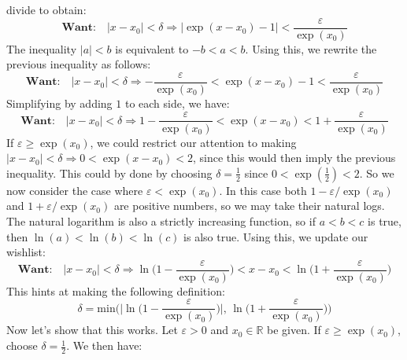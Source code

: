 \documentclass{article}
\theoremstyle{normal}
\theoremstyle{plain}
\begin{document}
    divide to obtain:
    \begin{equation}
        \textbf{Want:}\quad
        |x-x_{0}|<\delta
        \Rightarrow
        \big|\exp(x-x_{0})-1\big|<\frac{\varepsilon}{\exp(x_{0})}
    \end{equation}
    The inequality $|a|<b$ is equivalent to $-b<a<b$. Using this, we rewrite
    the previous inequality as follows:
    \begin{equation}
        \textbf{Want:}\quad
        |x-x_{0}|<\delta
        \Rightarrow
        -\frac{\varepsilon}{\exp(x_{0})}
            <\exp(x-x_{0})-1
            <\frac{\varepsilon}{\exp(x_{0})}
    \end{equation}
    Simplifying by adding $1$ to each side, we have:
    \begin{equation}
        \textbf{Want:}\quad
        |x-x_{0}|<\delta
        \Rightarrow
        1-\frac{\varepsilon}{\exp(x_{0})}
            <\exp(x-x_{0})
            <1+\frac{\varepsilon}{\exp(x_{0})}
    \end{equation}
    If $\varepsilon\geq\exp(x_{0})$, we could restrict our attention to making
    $|x-x_{0}|<\delta\Rightarrow{0}<\exp(x-x_{0})<2$, since this would then
    imply the previous inequality. This could by done by choosing
    $\delta=\frac{1}{2}$ since $0<\exp(\frac{1}{2})<2$. So we now consider the
    case where $\varepsilon<\exp(x_{0})$. In this case both
    $1-\varepsilon/\exp(x_{0})$ and $1+\varepsilon/\exp(x_{0})$ are positive
    numbers, so we may take their natural logs. The natural logarithm is
    also a strictly increasing function, so if $a<b<c$ is true, then
    $\ln(a)<\ln(b)<\ln(c)$ is also true. Using this, we update our wishlist:
    \begin{equation}
        \textbf{Want:}\quad
        |x-x_{0}|<\delta
        \Rightarrow
        \ln\big(1-\frac{\varepsilon}{\exp(x_{0})}\big)
            <x-x_{0}
            <\ln\big(1+\frac{\varepsilon}{\exp(x_{0})}\big)
    \end{equation}
    This hints at making the following definition:
    \begin{equation}
        \delta=\textrm{min}\Big(
            \big|\ln\big(1-\frac{\varepsilon}{\exp(x_{0})}\big)\big|,\,
            \ln\big(1+\frac{\varepsilon}{\exp(x_{0})}\big)
        \Big)
    \end{equation}
    Now let's show that this works. Let $\varepsilon>0$ and $x_{0}\in\mathbb{R}$
    be given. If $\varepsilon\geq\exp(x_{0})$, choose $\delta=\frac{1}{2}$.
    We then have:
\end{document}
